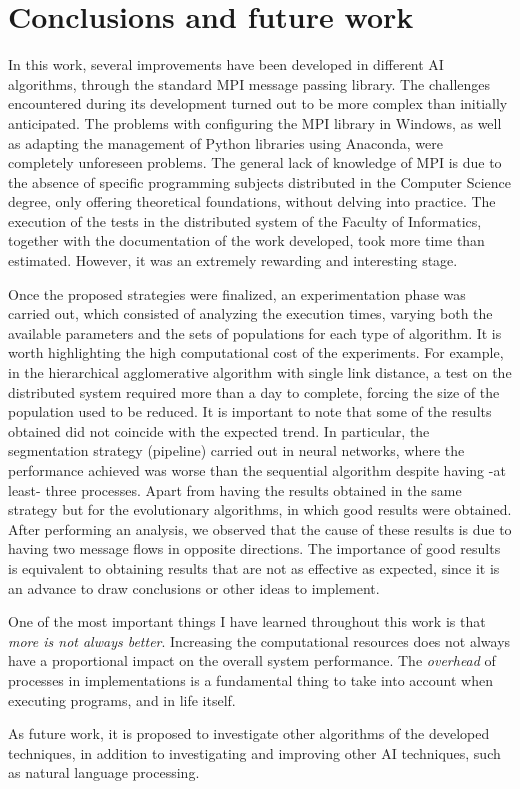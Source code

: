\chapter*{Conclusions and future work}
\label{cap:c5_conclu_en}

	
	In this work, several improvements have been developed in different AI algorithms, through the standard MPI message passing library. The challenges encountered during its development turned out to be more complex than initially anticipated. The problems with configuring the MPI library in Windows, as well as adapting the management of Python libraries using Anaconda, were completely unforeseen problems. The general lack of knowledge of MPI is due to the absence of specific programming subjects distributed in the Computer Science degree, only offering theoretical foundations, without delving into practice. The execution of the tests in the distributed system of the Faculty of Informatics, together with the documentation of the work developed, took more time than estimated. However, it was an extremely rewarding and interesting stage.
	
	
	Once the proposed strategies were finalized, an experimentation phase was carried out, which consisted of analyzing the execution times, varying both the available parameters and the sets of populations for each type of algorithm. It is worth highlighting the high computational cost of the experiments. For example, in the hierarchical agglomerative algorithm with single link distance, a test on the distributed system required more than a day to complete, forcing the size of the population used to be reduced. It is important to note that some of the results obtained did not coincide with the expected trend. In particular, the segmentation strategy (pipeline) carried out in neural networks, where the performance achieved was worse than the sequential algorithm despite having -at least- three processes. Apart from having the results obtained in the same strategy but for the evolutionary algorithms, in which good results were obtained. After performing an analysis, we observed that the cause of these results is due to having two message flows in opposite directions. The importance of good results is equivalent to obtaining results that are not as effective as expected, since it is an advance to draw conclusions or other ideas to implement.
	
	
	One of the most important things I have learned throughout this work is that \textit{more is not always better}. Increasing the computational resources does not always have a proportional impact on the overall system performance. The \textit{overhead} of processes in implementations is a fundamental thing to take into account when executing programs, and in life itself.	
	
	
	As future work, it is proposed to investigate other algorithms of the developed techniques, in addition to investigating and improving other AI techniques, such as natural language processing.
	
	
	
	
	
